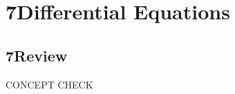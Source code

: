 \documentclass{sebase}
\begin{document}
\chapter{7\quad Differential Equations}

\section{7\quad Review}

CONCEPT CHECK\vspace{-12pt}

\end{document}
